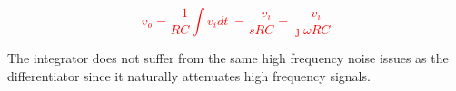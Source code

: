 \textcolor{red}{
\begin{equation}
v_{o} = \frac{-1}{RC}\int v_{i}dt\ = \frac{-v_{i}}{sRC} = \frac{-v_{i}}{\jmath \omega RC}
\label{eq:integrator}
\end{equation}
}

The integrator does not suffer from the same high frequency noise issues as the differentiator since it naturally attenuates high frequency signals.

